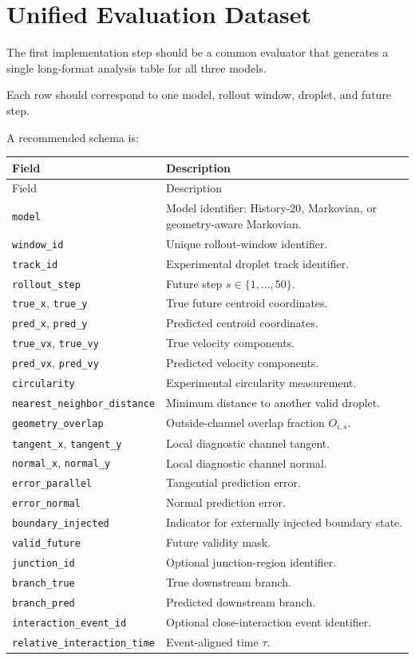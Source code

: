 \documentclass[11pt]{article}
\begin{document}
\section{Unified Evaluation Dataset}

The first implementation step should be a common evaluator that generates a single long-format analysis table for all three models.

Each row should correspond to one model, rollout window, droplet, and future step.

A recommended schema is:

\begin{longtable}{p{}p{}}
\toprule
Field & Description \\
\midrule
\endfirsthead
\toprule
Field & Description \\
\midrule
\endhead
\texttt{model} & Model identifier: History-20, Markovian, or geometry-aware Markovian. \\
\texttt{window\_id} & Unique rollout-window identifier. \\
\texttt{track\_id} & Experimental droplet track identifier. \\
\texttt{rollout\_step} & Future step \(s\in\{1,\ldots,50\}\). \\
\texttt{true\_x}, \texttt{true\_y} & True future centroid coordinates. \\
\texttt{pred\_x}, \texttt{pred\_y} & Predicted centroid coordinates. \\
\texttt{true\_vx}, \texttt{true\_vy} & True velocity components. \\
\texttt{pred\_vx}, \texttt{pred\_vy} & Predicted velocity components. \\
\texttt{circularity} & Experimental circularity measurement. \\
\texttt{nearest\_neighbor\_distance} & Minimum distance to another valid droplet. \\
\texttt{geometry\_overlap} & Outside-channel overlap fraction \(O_{i,s}\). \\
\texttt{tangent\_x}, \texttt{tangent\_y} & Local diagnostic channel tangent. \\
\texttt{normal\_x}, \texttt{normal\_y} & Local diagnostic channel normal. \\
\texttt{error\_parallel} & Tangential prediction error. \\
\texttt{error\_normal} & Normal prediction error. \\
\texttt{boundary\_injected} & Indicator for externally injected boundary state. \\
\texttt{valid\_future} & Future validity mask. \\
\texttt{junction\_id} & Optional junction-region identifier. \\
\texttt{branch\_true} & True downstream branch. \\
\texttt{branch\_pred} & Predicted downstream branch. \\
\texttt{interaction\_event\_id} & Optional close-interaction event identifier. \\
\texttt{relative\_interaction\_time} & Event-aligned time \(\tau\). \\
\bottomrule
\end{longtable}
\end{document}
